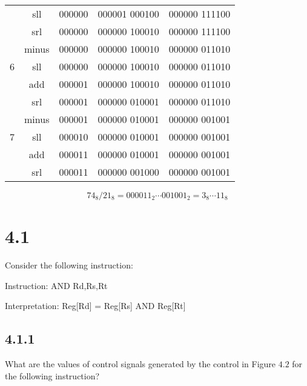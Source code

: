 \documentclass[paper=a4, fontsize=11pt]{scrartcl} %
\begin{document}
\begin{table}[hp]
\begin{tabular}{ccccc}
                              & sll   & 000000 & 000001 000100 & 000000 111100 \\
                              & srl   & 000000 & 000000 100010 & 000000 111100 \\
        \midrule
        \multirow{3}{*}{6}    & minus & 000000 & 000000 100010 & 000000 011010 \\
                              & sll   & 000000 & 000000 100010 & 000000 011010 \\
                              & add   & 000001 & 000000 100010 & 000000 011010 \\
                              & srl   & 000001 & 000000 010001 & 000000 011010 \\
        \midrule
        \multirow{3}{*}{7}    & minus & 000001 & 000000 010001 & 000000 001001 \\
                              & sll   & 000010 & 000000 010001 & 000000 001001 \\
                              & add   & 000011 & 000000 010001 & 000000 001001 \\
                              & srl   & 000011 & 000000 001000 & 000000 001001 \\
        \bottomrule
    \end{tabular}
\end{table}

$${74}_8 / {21}_8 = {000011}_2 \cdots {001001}_2 = {3}_8 \cdots {11}_8$$


\section{4.1}

\begin{fancyquotes}
  Consider the following instruction:

  Instruction: AND Rd,Rs,Rt

  Interpretation: Reg[Rd] = Reg[Rs] AND Reg[Rt]
\end{fancyquotes}

\subsection{4.1.1}

\begin{fancyquotes}
  What are the values of control signals generated by the control in Figure $4.2$ for the following instruction?
\end{fancyquotes}
\end{document}
